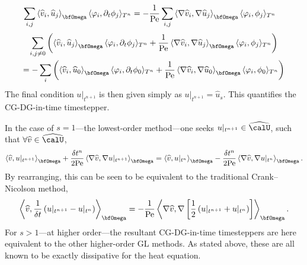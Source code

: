 \begin{example}
\begin{align}
          \sum_{i, j}\left\langle\widehat{v}_{i}, \widehat{u}_{j}\right\rangle_{\bfOmega}\langle\varphi_{i}, \partial_{t}\phi_{j}\rangle_{T^{n}}  &=  - \frac{1}{\rmPe}\sum_{i, j}\left\langle\nabla\widehat{v}_{i}, \nabla\widehat{u}_{j}\right\rangle_{\bfOmega}\langle\varphi_{i}, \phi_{j}\rangle_{T^{n}}
      \end{align}
      \vspace{-8mm}
      \begin{multline}
          \sum_{i, j \neq 0}\left(\left\langle\widehat{v}_{i}, \widehat{u}_{j}\right\rangle_{\bfOmega}\langle\varphi_{i}, \partial_{t}\phi_{j}\rangle_{T^{n}} + \frac{1}{\rmPe}\left\langle\nabla\widehat{v}_{i}, \nabla\widehat{u}_{j}\right\rangle_{\bfOmega}\langle\varphi_{i}, \phi_{j}\rangle_{T^{n}}\right)  \\
          =  - \sum_{i}\left(\left\langle\widehat{v}_{i}, \widehat{u}_{0}\right\rangle_{\bfOmega}\langle\varphi_{i}, \partial_{t}\phi_{0}\rangle_{T^{n}} + \frac{1}{\rmPe}\left\langle\nabla\widehat{v}_{i}, \nabla\widehat{u}_{0}\right\rangle_{\bfOmega}\langle\varphi_{i}, \phi_{0}\rangle_{T^{n}}\right)
      \end{multline}
      The final condition $u|_{t^{n + 1}}$ is then given simply as $u|_{t^{n + 1}}  =  \widehat{u}_{s}$. This quantifies the CG-DG-in-time timestepper.
    \end{example}

    In the case of $s  =  1$---the lowest-order method---one seeks $u|_{t^{n + 1}}  \in  \widehat{\calU}$, such that $\forall \widehat{v}  \in  \widehat{\calU}$,
    \begin{equation}
        \left\langle\widehat{v}, u|_{t^{n + 1}}\right\rangle_{\bfOmega} + \frac{\delta t^{n}}{2\rmPe}\left\langle\nabla\widehat{v}, \nabla u|_{t^{n + 1}}\right\rangle_{\bfOmega}  =  \left\langle\widehat{v}, u|_{t^{n}}\right\rangle_{\bfOmega} - \frac{\delta t^{n}}{2\rmPe}\left\langle\nabla\widehat{v}, \nabla u|_{t^{n}}\right\rangle_{\bfOmega}.
    \end{equation}
    By rearranging, this can be seen to be equivalent to the traditional Crank--Nicolson method,
    \begin{equation}
        \left\langle\widehat{v}, \frac{1}{\delta t}\left(u|_{t^{n + 1}} - u|_{t^{n}}\right)\right\rangle_{\bfOmega}  =  - \frac{1}{\rmPe}\left\langle\nabla\widehat{v}, \nabla\left[\frac{1}{2}\left(u|_{t^{n + 1}} + u|_{t^{n}}\right)\right]\right\rangle_{\bfOmega}.
    \end{equation}
    For $s  >  1$---at higher order---the resultant CG-DG-in-time timesteppers are here equivalent to the other higher-order GL methods. As stated above, these are all known to be exactly dissipative for the heat equation.
    
